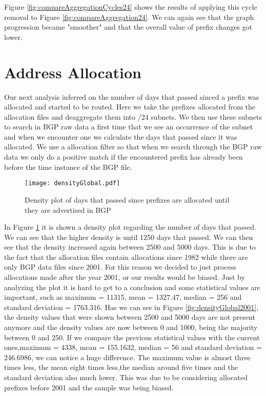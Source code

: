 \documentclass[11pt,a4paper]{scrreprt}
\begin{document}
Figure \ref{fig:compareAggregationCycles24} shows the results of applying this cycle removal to Figure \ref{fig:compareAggregation24}. We can again see that the graph progression became "smoother" and that the overall value of prefix changes got lower. 

\section{Address Allocation}

Our next analysis inferred on the number of days that passed sinced a prefix was allocated and started to be routed. Here we take the prefixes allocated from the allocation files and deaggregate them into /24 subnets. We then use these subnets to search in BGP raw data a first time that we see an occurrence of the subnet and when we encounter one we calculate the days that passed since it was allocated. We use a allocation filter so that when we search through the BGP raw data we only do a positive match if the encountered prefix has already been before the time instance of the BGP file.  

\begin{figure}[!h]
\centering
\texttt{[image: densityGlobal.pdf]}
\caption{Density plot of days that passed since prefixes are allocated until they are advertised in BGP}
\label{fig:densityGlobal}
\end{figure}

In Figure \ref{fig:densityGlobal} it is shown a density plot regarding the number of days that passed. We can see that the higher density is until 1250 days that passed. We can then see that the density increased again between 2500 and 5000 days. This is due to the fact that the allocation files contain allocations since 1982 while there are only BGP data files since 2001. For this reason we decided to just process allocations made after the year 2001, or our results would be biased. Just by analyzing the plot it is hard to get to a conclusion and some statistical values are important, such as maximum = 11315, mean = 1327.47, median = 256 and standard deviation = 1763.316. 
Has we can see in Figure \ref{fig:densityGlobal2001}, the density values that were shown between 2500
and 5000 days  are not present anymore and the density values are now between 0 and 1000, being the majority between 0 and 250. If we compare the previous statistical values with the current ones,maximum = 4338, mean = 155.1632, median = 56 and standard deviation = 246.6986, we can notice a huge difference. The maximum value is almost three times less, the mean eight times less,the median around five times and the standard deviation also much lower. This was due to be considering allocated prefixes before 2001 and the sample was being biased.
\end{document}
